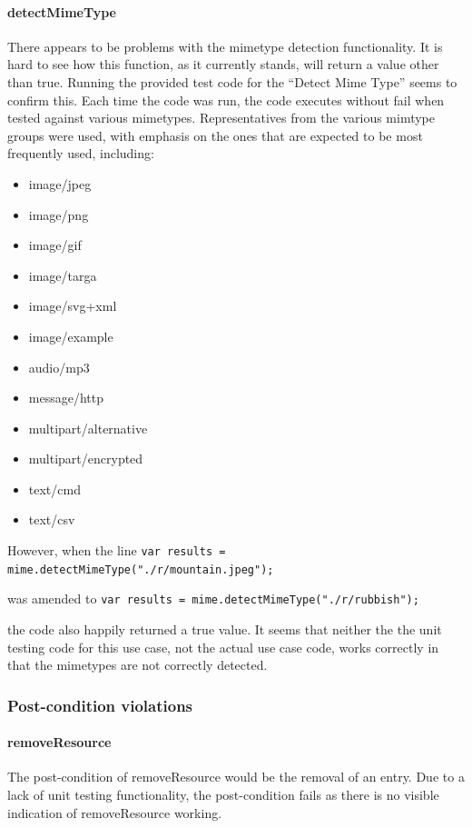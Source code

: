 \documentclass[a4paper]{article}
\begin{document}
\paragraph{detectMimeType} 
There appears to be problems with the mimetype detection functionality. It is hard to see how this function, as it currently stands, will return a value other than true. Running the provided test code for the “Detect Mime Type” seems to confirm this. Each time the code was run, the code executes without fail when tested against various mimetypes. Representatives from the various mimtype groups were used, with emphasis on the ones that are expected to be most frequently used, including:
\begin{itemize}
\item image/jpeg
\item image/png
\item image/gif
\item image/targa
\item image/svg+xml
\item image/example
\item audio/mp3
\item message/http
\item multipart/alternative
\item multipart/encrypted
\item text/cmd
\item text/csv
\end{itemize}
However, when the line \texttt{var results = mime.detectMimeType("./r/mountain.jpeg");} 

was amended to \texttt{var results = mime.detectMimeType("./r/rubbish");}

the code also happily returned a true value. It seems that neither the the unit testing code for this use case, not the actual use case code, works correctly in that the mimetypes are not correctly detected.

\subsubsection {Post-condition violations}

\paragraph{removeResource}
The post-condition of removeResource would be the removal of an entry. Due to a lack of unit testing functionality, the post-condition fails as there is no visible indication of removeResource working.
\end{document}
